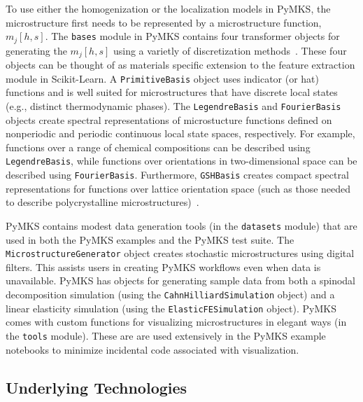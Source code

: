 \documentclass{bmcart}
\begin{document}
To use either the homogenization or the localization models in PyMKS,
the microstructure first needs to be represented by a microstructure
function, $m_j\left[h, s\right]$. The \texttt{bases} module in PyMKS
contains four transformer objects for generating the
$m_j\left[h,s\right]$ using a varietly of discretization
methods~\cite{landi2010multi, kalidindi2010novel,
yabansu2014calibrated, al2012multi, kalidindi2011microstructure,
gupta2015structure, cceccen2014data, brough2016microstructure}.
These four objects can be thought of as materials specific
extension to the feature extraction
module in Scikit-Learn. A \texttt{PrimitiveBasis} object uses
indicator (or hat) functions and is well suited for microstructures
that have discrete local states (e.g., distinct thermodynamic
phases). The \texttt{LegendreBasis} and \texttt{FourierBasis} objects
create spectral representations of microstucture functions defined on
nonperiodic and periodic continuous local state spaces,
respectively. For example, functions over a range of chemical
compositions can be described using \texttt{LegendreBasis}, while
functions over orientations in two-dimensional space can be described
using \texttt{FourierBasis}. Furthermore, \texttt{GSHBasis} creates
compact spectral representations for functions over lattice
orientation space (such as those needed to describe polycrystalline
microstructures)~\cite{ kalidindi2006spectral, shaffer2010building,
knezevic2010deformation, al2010spectral, duvvuru2007application,
li2003evolution, li2005texture, li2007processing, li2005processing,
creuziger2014crystallographic, sundararaghavan2008multi,
sundararaghavan2007linear}.

PyMKS contains modest data generation tools (in the \texttt{datasets}
module) that are used in both the PyMKS examples and the PyMKS test
suite. The \texttt{MicrostructureGenerator} object creates stochastic
microstructures using digital filters. This assists users in creating
PyMKS workflows even when data is unavailable. PyMKS has objects for
generating sample data from both a spinodal decomposition simulation
(using the \texttt{CahnHilliardSimulation} object) and a linear
elasticity simulation (using the \texttt{ElasticFESimulation}
object). PyMKS comes with custom functions for visualizing
microstructures in elegant ways (in the \texttt{tools} module). These
are are used extensively in the PyMKS example notebooks to minimize
incidental code associated with visualization.

\subsection{Underlying Technologies}
\end{document}
